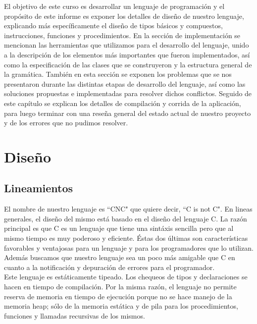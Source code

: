 \documentclass[11pt, spanish]{report}
\begin{document}
El objetivo de este curso es desarrollar un lenguaje de programaci\'on y el prop\'osito de este informe es exponer los detalles de 
dise\~no de nuestro lenguaje, explicando m\'as espec\'ificamente el dise\~no de tipos b\'asicos y compuestos, instrucciones, funciones y procedimientos. 
En la secci\'on de implementaci\'on se mencionan las herramientas que utilizamos para el desarrollo del lenguaje, unido a la descripci\'on 
de los elementos m\'as importantes que fueron implementados, as\'i como la especificaci\'on de las clases que se construyeron y la estructura 
general de la gram\'atica. Tambi\'en en esta secci\'on se exponen los problemas que se nos presentaron durante las distintas etapas de 
desarrollo del lenguaje, as\'i como las soluciones propuestas e implementadas para resolver dichos conflictos. Seguido de este cap\'itulo 
se explican los detalles de compilaci\'on y corrida de la aplicaci\'on, para luego terminar con una rese\~na general del estado actual de 
nuestro proyecto y de los errores que no pudimos resolver.\\

\chapter{Dise\~no}
\section{Lineamientos}

El nombre de nuestro lenguaje es ``CNC" que quiere decir, ``C is not C". En lineas generales, el dise\~no del mismo est\'a basado en el dise\~no 
del lenguaje C. La raz\'on principal es que C es un lenguaje que tiene una sint\'axis sencilla pero que al mismo tiempo es muy poderoso y eficiente. 
\'Estas dos \'ultimas son caracter\'isticas favorables y ventajosas para un lenguaje y para los programadores que lo utilizan. Adem\'as buscamos 
que nuestro lenguaje sea un poco m\'as amigable que C en cuanto a la notificaci\'on y depuraci\'on de errores para el programador.\\

Este lenguaje es est\'aticamente tipeado. Los chequeos de tipos y declaraciones se hacen en tiempo de compilaci\'on. Por la misma raz\'on,
el lenguaje no permite reserva de memoria en tiempo de ejecuci\'on porque no se hace manejo de la memoria heap; s\'olo de la memoria est\'atica 
y de pila para los procedimientos, funciones y llamadas recursivas de los mismos.\\
\end{document}
